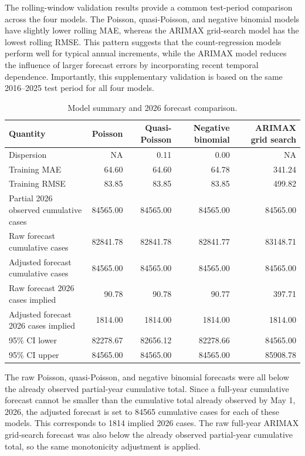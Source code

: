 \documentclass[utf8]{FrontiersinHarvard} %
\begin{document}
The rolling-window validation results provide a common test-period comparison across the four models. The Poisson, quasi-Poisson, and negative binomial models have slightly lower rolling MAE, whereas the ARIMAX grid-search model has the lowest rolling RMSE. This pattern suggests that the count-regression models perform well for typical annual increments, while the ARIMAX model reduces the influence of larger forecast errors by incorporating recent temporal dependence. Importantly, this supplementary validation is based on the same 2016--2025 test period for all four models.


\begin{table}[h!]
\centering
\caption{Model summary and 2026 forecast comparison.}
\label{tab:model_summary_comparison}
\tiny
\begin{tabular}{lrrrr}
\toprule
Quantity & Poisson & Quasi-Poisson & Negative binomial & ARIMAX grid search \\
\midrule
Dispersion & NA & 0.11 & 0.00 & NA \\
Training MAE & 64.60 & 64.60 & 64.78 & 341.24 \\
Training RMSE & 83.85 & 83.85 & 83.85 & 499.82 \\
Partial 2026 observed cumulative cases & 84565.00 & 84565.00 & 84565.00 & 84565.00 \\
Raw forecast cumulative cases & 82841.78 & 82841.78 & 82841.77 & 83148.71 \\
Adjusted forecast cumulative cases & 84565.00 & 84565.00 & 84565.00 & 84565.00 \\
Raw forecast 2026 cases implied & 90.78 & 90.78 & 90.77 & 397.71 \\
Adjusted forecast 2026 cases implied & 1814.00 & 1814.00 & 1814.00 & 1814.00 \\
95\% CI lower & 82278.67 & 82656.12 & 82278.66 & 84565.00 \\
95\% CI upper & 84565.00 & 84565.00 & 84565.00 & 85908.78 \\
\bottomrule
\end{tabular}
\end{table}

The raw Poisson, quasi-Poisson, and negative binomial forecasts were all below the already observed partial-year cumulative total. Since a full-year cumulative forecast cannot be smaller than the cumulative total already observed by May 1, 2026, the adjusted forecast is set to 84565 cumulative cases for each of these models. This corresponds to 1814 implied 2026 cases. The raw full-year ARIMAX grid-search forecast was also below the already observed partial-year cumulative total, so the same monotonicity adjustment is applied.
\end{document}
